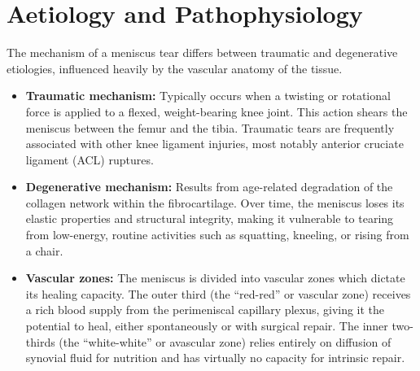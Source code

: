 \section*{Aetiology and Pathophysiology}
The mechanism of a meniscus tear differs between traumatic and degenerative etiologies, influenced heavily by the vascular anatomy of the tissue.
\begin{itemize}
    \item \textbf{Traumatic mechanism:} Typically occurs when a twisting or rotational force is applied to a flexed, weight-bearing knee joint. This action shears the meniscus between the femur and the tibia. Traumatic tears are frequently associated with other knee ligament injuries, most notably anterior cruciate ligament (ACL) ruptures.
    \item \textbf{Degenerative mechanism:} Results from age-related degradation of the collagen network within the fibrocartilage. Over time, the meniscus loses its elastic properties and structural integrity, making it vulnerable to tearing from low-energy, routine activities such as squatting, kneeling, or rising from a chair.
    \item \textbf{Vascular zones:} The meniscus is divided into vascular zones which dictate its healing capacity. The outer third (the ``red-red'' or vascular zone) receives a rich blood supply from the perimeniscal capillary plexus, giving it the potential to heal, either spontaneously or with surgical repair. The inner two-thirds (the ``white-white'' or avascular zone) relies entirely on diffusion of synovial fluid for nutrition and has virtually no capacity for intrinsic repair.
\end{itemize}

